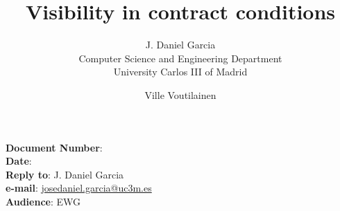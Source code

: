 \documentclass[10pt,a4paper,oneside,final,notitlepage]{article}%
\begin{document}


\noindent
\textbf{Document Number}: \texttt{\paperid}\\
\textbf{Date}: \paperdate\\
\textbf{Reply to}: J. Daniel Garcia\\ 
\textbf{e-mail}: \url{josedaniel.garcia@uc3m.es}\\
\textbf{Audience}: EWG\\

\title{Visibility in contract conditions}
\author{J. Daniel Garcia\\
Computer Science and Engineering Department\\
University Carlos III of Madrid
\and
Ville Voutilainen
}
\date{}

\begingroup
\let\newpage\relax%
\maketitle
\endgroup





\end{document}
